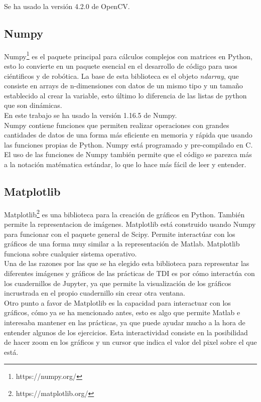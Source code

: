 \documentclass[a4paper,12pt]{report}
\begin{document}
Se ha usado la versión 4.2.0 de OpenCV.\\


\subsection{Numpy}

Numpy\footnote{https://numpy.org/} es el paquete principal para cálculos complejos con matrices en Python, esto lo convierte en un paquete esencial en el desarrollo de código para usos ciéntificos y de robótica. La base de esta biblioteca es el objeto \emph{ndarray}, que consiste en arrays de n-dimensiones con datos de un mismo tipo y un tamaño establecido al crear la variable, esto último lo diferencia de las listas de python que son dinámicas.\\

En este trabajo se ha usado la versión 1.16.5 de Numpy.\\

Numpy contiene funciones que permiten realizar operaciones con grandes cantidades de datos de una forma más eficiente en memoria y rápida que usando las funciones propias de Python. Numpy está programado y pre-compilado en C. El uso de las funciones de Numpy también permite que el código se parezca más a la notación matématica estándar, lo que lo hace más fácil de leer y entender.\\

\subsection{Matplotlib}

Matplotlib\footnote{https://matplotlib.org/} es una biblioteca para la creación de gráficos en Python. También permite la representacion de imágenes. Matplotlib está construido usando Numpy para funcionar con el paquete general de Scipy. Permite interactúar con los gráficos de una forma muy similar a la representación de Matlab. Matplotlib funciona sobre cualquier sistema operativo. \\

Una de las razones por las que se ha elegido esta biblioteca para representar las diferentes imágenes y gráficos de las prácticas de TDI es por cómo interactúa con los cuadernillos de Jupyter, ya que permite la visualización de los gráficos incrustrada en el propio cuadernillo sin crear otra ventana. \\

Otro punto a favor de Matplotlib es la capacidad para interactuar con los gráficos, cómo ya se ha mencionado antes, esto es algo que permite Matlab e interesaba mantener en las prácticas, ya que puede ayudar mucho a la hora de entender algunos de los ejercicios. Esta interactividad consiste en la posibilidad de hacer zoom en los gráficos y un cursor que indica el valor del pixel sobre el que está.
\end{document}
